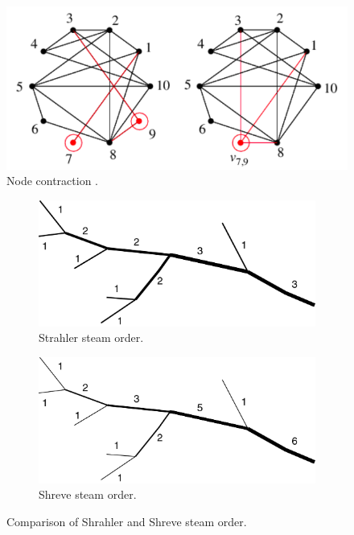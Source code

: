 \documentclass[a4paper]{article}
\begin{document}
    \begin{figure}
        \includegraphics[width=\linewidth]{out.png}
        \caption{Node contraction \cite{wolfram}.}
        \label{fig:nodecontraaction}
    \end{figure}

    \begin{figure}[h!]
        \centering
        \begin{subfigure}[b]{0.4\linewidth}
            \includegraphics[width=\linewidth]{strahler.png}
            \caption{Strahler steam order.}
            \label{fig:strahler}
        \end{subfigure}
        \begin{subfigure}[b]{0.4\linewidth}
            \includegraphics[width=\linewidth]{shreve.png}
            \caption{Shreve steam order.}
            \label{fig:shreve}
        \end{subfigure}
        \caption{Comparison of Shrahler and Shreve steam order.}
    \end{figure}

    \printbibliography    
\end{document}
